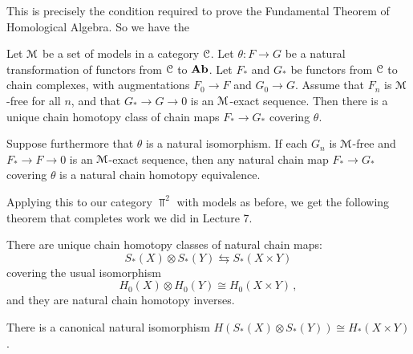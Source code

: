 This is precisely the condition required to prove the Fundamental Theorem
of Homological Algebra. So we have the 
\begin{theorem}
Let $\mathcal M$ be a set of models in a category $\mathcal C$. Let $\theta:F\to G$ be 
a natural transformation of functors from $\mathcal C$ to $\mathbf{Ab}$. Let 
$F_*$ and $G_*$ be functors from $\mathcal C$ to chain complexes, with augmentations
$F_0\to F$ and $G_0\to G$. Assume that $F_n$ is $\mathcal M$-free for all $n$, and
that $G_*\to G\to0$ is an $\mathcal M$-exact sequence. Then there is a unique
chain homotopy class of chain maps $F_*\to G_*$ covering $\theta$. 
\end{theorem}
\begin{corollary}
Suppose furthermore that $\theta$ is a natural isomorphism. If
each $G_n$ is $\mathcal M$-free and $F_*\to F\to0$ is an $\mathcal M$-exact
sequence, then any natural chain map $F_*\to G_*$ covering $\theta$ is  
a natural chain homotopy equivalence. 
\end{corollary}

Applying this to our category $\Top^2$ with models as before, we get 
the following theorem that completes work we did in Lecture 7.
\begin{theorem}
There are unique chain homotopy classes of natural chain maps:
\begin{equation*}
S_\ast(X)\otimes S_\ast(Y)\leftrightarrows S_\ast(X\times Y)
\end{equation*}
covering the usual isomorphism
\[
H_0(X)\otimes H_0(Y)\cong H_0(X\times Y)\,,
\]
and they are natural chain homotopy inverses. 
\end{theorem}
\begin{corollary}
There is a canonical natural 
isomorphism $H(S_\ast(X)\otimes S_\ast(Y))\cong H_\ast(X\times Y)$.
\end{corollary}

